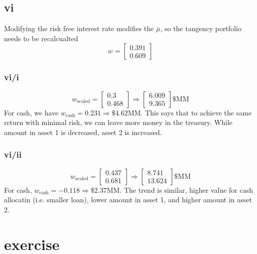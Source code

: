 \documentclass{article}
\begin{document}
\subsection*{vi}
Modifying the risk free interest rate modifies the $\bar\mu$, so the tangency portfolio needs to be recalcualted
$$\displaystyle w = \left[\begin{matrix}0.391\\0.609\end{matrix}\right]$$

\subsubsection*{vi/i}
$$\displaystyle w_\text{scaled} = \left[\begin{matrix}0.3\\0.468\end{matrix}\right]\Rightarrow \displaystyle \left[\begin{matrix}6.009\\9.365\end{matrix}\right] \$\text{MM}$$
For cash,
we have
$w_\text{cash} = 0.231 \Rightarrow \$4.62\text{MM}$.
    This says that to achieve the same return with minimal risk,
    we can leave more money in the treasury. While amount in asset 1 is decreased, asset 2 is increased.

    \subsubsection*{vi/ii}
    $$\displaystyle w_\text{scaled} = \left[\begin{matrix}0.437\\0.681\end{matrix}\right] \Rightarrow \displaystyle \left[\begin{matrix}8.741\\13.624\end{matrix}\right] \$\text{MM}$$
    For cash, $w_\text{cash} = -0.118 \Rightarrow \$2.37\text{MM}$.
The trend is similar, higher value for cash allocatin (i.e. smaller loan),
lower amount in asset 1, and higher amount in asset 2.

\section{exercise}
\end{document}
